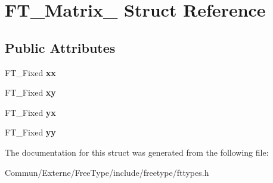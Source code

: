 \hypertarget{struct_f_t___matrix__}{}\section{F\+T\+\_\+\+Matrix\+\_\+ Struct Reference}
\label{struct_f_t___matrix__}
\subsection*{Public Attributes}
\begin{DoxyCompactItemize}
\item 
F\+T\+\_\+\+Fixed {\bfseries xx}\hypertarget{struct_f_t___matrix___a27d51c2958634abe7bf377610e095f74}{}\label{struct_f_t___matrix___a27d51c2958634abe7bf377610e095f74}

\item 
F\+T\+\_\+\+Fixed {\bfseries xy}\hypertarget{struct_f_t___matrix___a7e9f439d37c00ba1a11919bcaa8937a2}{}\label{struct_f_t___matrix___a7e9f439d37c00ba1a11919bcaa8937a2}

\item 
F\+T\+\_\+\+Fixed {\bfseries yx}\hypertarget{struct_f_t___matrix___a55792583a843a1611b43c40534a02a17}{}\label{struct_f_t___matrix___a55792583a843a1611b43c40534a02a17}

\item 
F\+T\+\_\+\+Fixed {\bfseries yy}\hypertarget{struct_f_t___matrix___a689a6fd20a88238788b90c3597ee0c2a}{}\label{struct_f_t___matrix___a689a6fd20a88238788b90c3597ee0c2a}

\end{DoxyCompactItemize}


The documentation for this struct was generated from the following file\+:\begin{DoxyCompactItemize}
\item 
Commun/\+Externe/\+Free\+Type/include/freetype/fttypes.\+h\end{DoxyCompactItemize}
